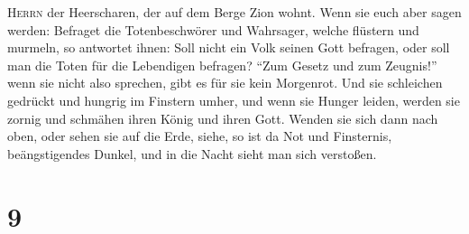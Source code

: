 \textsc{Herrn} der Heerscharen, der auf dem Berge Zion wohnt.
 Wenn sie euch aber sagen werden: Befraget die
Totenbeschwörer und Wahrsager, welche flüstern und murmeln, so antwortet
ihnen: Soll nicht ein Volk seinen Gott befragen, oder soll man die Toten
für die Lebendigen befragen? ``Zum Gesetz und zum Zeugnis!''
 wenn sie nicht also sprechen, gibt es für sie kein
Morgenrot.  Und sie schleichen gedrückt und hungrig im
Finstern umher, und wenn sie Hunger leiden, werden sie zornig und
schmähen ihren König und ihren Gott.  Wenden sie sich
dann nach oben, oder sehen sie auf die Erde, siehe, so ist da Not und
Finsternis, beängstigendes Dunkel, und in die Nacht sieht man sich
verstoßen.

\hypertarget{section-8}{%
\section{9}\label{section-8}}

